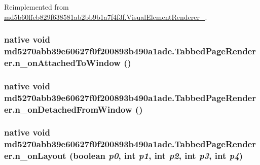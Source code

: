 Reimplemented from \hyperlink{classmd5b60ffeb829f638581ab2bb9b1a7f4f3f_1_1_visual_element_renderer__1_4a1c180026d8eab71549e47b7de4b9b8}{md5b60ffeb829f638581ab2bb9b1a7f4f3f.VisualElementRenderer\_}.\hypertarget{classmd5270abb39e60627f0f200893b490a1ade_1_1_tabbed_page_renderer_d0abc58418ee19fc0eb3c0f02189675c}{
\subsubsection[{n\_\-onAttachedToWindow}]{\setlength{\rightskip}{0pt plus 5cm}native void md5270abb39e60627f0f200893b490a1ade.TabbedPageRenderer.n\_\-onAttachedToWindow ()}}
\label{classmd5270abb39e60627f0f200893b490a1ade_1_1_tabbed_page_renderer_d0abc58418ee19fc0eb3c0f02189675c}


\hypertarget{classmd5270abb39e60627f0f200893b490a1ade_1_1_tabbed_page_renderer_06ad1a28c8566b4a6e4338aab262bc31}{
\subsubsection[{n\_\-onDetachedFromWindow}]{\setlength{\rightskip}{0pt plus 5cm}native void md5270abb39e60627f0f200893b490a1ade.TabbedPageRenderer.n\_\-onDetachedFromWindow ()}}
\label{classmd5270abb39e60627f0f200893b490a1ade_1_1_tabbed_page_renderer_06ad1a28c8566b4a6e4338aab262bc31}


\hypertarget{classmd5270abb39e60627f0f200893b490a1ade_1_1_tabbed_page_renderer_4fb0dec5bc638178fcee3690897ce067}{
\subsubsection[{n\_\-onLayout}]{\setlength{\rightskip}{0pt plus 5cm}native void md5270abb39e60627f0f200893b490a1ade.TabbedPageRenderer.n\_\-onLayout (boolean {\em p0}, \/  int {\em p1}, \/  int {\em p2}, \/  int {\em p3}, \/  int {\em p4})}}
\label{classmd5270abb39e60627f0f200893b490a1ade_1_1_tabbed_page_renderer_4fb0dec5bc638178fcee3690897ce067}





